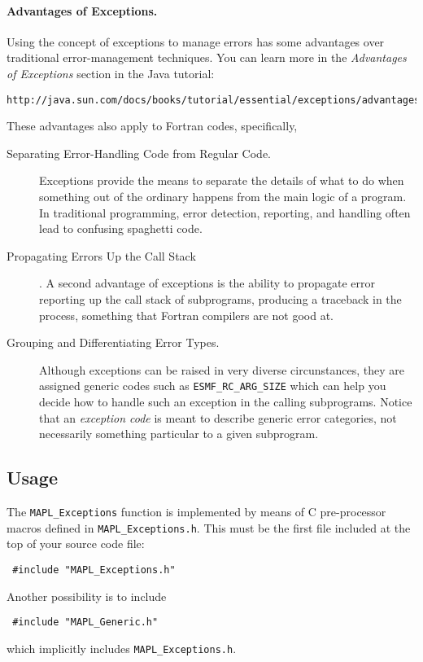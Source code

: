 \paragraph{Advantages of Exceptions.} Using the concept of exceptions
to manage errors has some advantages over traditional error-management
techniques. You can learn more in the {\em Advantages of Exceptions}
section in the Java tutorial:
\begin{verbatim}
http://java.sun.com/docs/books/tutorial/essential/exceptions/advantages.html
\end{verbatim}
These advantages also apply to Fortran codes, specifically,
\begin{description}

\item[Separating Error-Handling Code from Regular Code.] Exceptions
  provide the means to separate the details of what to do when
  something out of the ordinary happens from the main logic of a
  program. In traditional programming, error detection, reporting, and
  handling often lead to confusing spaghetti code.
  
\item[Propagating Errors Up the Call Stack].  A second advantage of
  exceptions is the ability to propagate error reporting up the call
  stack of subprograms, producing a traceback in the process,
  something that Fortran compilers are not good at.

\item[Grouping and Differentiating Error Types.] Although exceptions
  can be raised in very diverse circunstances, they are assigned
  generic codes such as {\tt ESMF\_RC\_ARG\_SIZE} which can help you
  decide how to handle such an exception in the calling
  subprograms. Notice that an {\em exception code} is meant to
  describe generic error categories, not necessarily something
  particular to a given subprogram.
\end{description}

\subsection*{Usage}

The {\tt MAPL\_Exceptions} function is implemented by means of C
pre-processor macros defined in {\tt MAPL\_Exceptions.h}. This must be
the first file included at the top of your source code file:
\begin{verbatim}
 #include "MAPL_Exceptions.h"
\end{verbatim}
Another possibility is to include
\begin{verbatim}
 #include "MAPL_Generic.h"
\end{verbatim}
which implicitly includes {\tt MAPL\_Exceptions.h}. 


